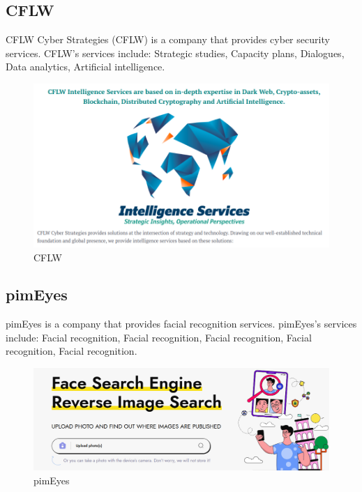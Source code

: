 \documentclass[openany]{report}
\begin{document}
\subsection{CFLW}
CFLW Cyber Strategies (CFLW) is a company that provides cyber security services. CFLW's services include: Strategic studies, Capacity plans, Dialogues, Data analytics, Artificial intelligence.
\begin{figure}[H]
    \centering
    \includegraphics[width=.95\textwidth]{./imgs/1.png}
    \caption{CFLW}
\end{figure}

\subsection{pimEyes}
pimEyes is a company that provides facial recognition services. pimEyes's services include: Facial recognition, Facial recognition, Facial recognition, Facial recognition, Facial recognition.
\begin{figure}[H]
    \centering
    \includegraphics[width=.95\textwidth]{./imgs/2.png}
    \caption{pimEyes}
\end{figure}
\end{document}
